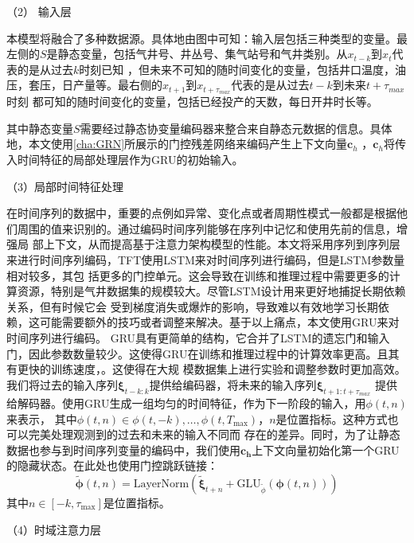 （2） 输入层

本模型将融合了多种数据源。具体地由图中可知：输入层包括三种类型的变量。最左侧的$S$是静态变量，包括气井号、井丛号、集气站号和气井类别。从$x_{t-k}$到$x_t$代表的是从过去$k$时刻已知
，但未来不可知的随时间变化的变量，包括井口温度，油压，套压，日产量等。最右侧的$x_{t+1}$到$x_{t+\tau_{max}} $代表的是从过去$t-k$到未来$t+\tau_{max}$时刻
都可知的随时间变化的变量，包括已经投产的天数，每日开井时长等。

其中静态变量$S$需要经过静态协变量编码器来整合来自静态元数据的信息。具体地，本文使用\ref{cha:GRN}所展示的门控残差网络来编码产生上下文向量$\mathbf{c}_h$
，$\mathbf{c}_h$将传入时间特征的局部处理层作为GRU的初始输入。

（3）局部时间特征处理

在时间序列的数据中，重要的点例如异常、变化点或者周期性模式一般都是根据他们周围的值来识别的。通过编码时间序列能够在序列中记忆和使用先前的信息，增强局
部上下文，从而提高基于注意力架构模型的性能。本文将采用序列到序列层来进行时间序列编码，TFT使用LSTM来对时间序列进行编码，但是LSTM参数量相对较多，其包
括更多的门控单元。这会导致在训练和推理过程中需要更多的计算资源，特别是气井数据集的规模较大。尽管LSTM设计用来更好地捕捉长期依赖关系，但有时候它会
受到梯度消失或爆炸的影响，导致难以有效地学习长期依赖，这可能需要额外的技巧或者调整来解决。基于以上痛点，本文使用GRU来对时间序列进行编码。
GRU具有更简单的结构，它合并了LSTM的遗忘门和输入门，因此参数数量较少。这使得GRU在训练和推理过程中的计算效率更高。且其有更快的训练速度，。这使得在大规
模数据集上进行实验和调整参数时更加高效。我们将过去的输入序列$\bm{\xi}_{t-k:k}$提供给编码器，将未来的输入序列$\bm{\xi}_{t+1:t+\tau_{max}}$
提供给解码器。使用GRU生成一组均匀的时间特征，作为下一阶段的输入，用$\phi (t,n)$来表示，
其中$\phi(t,n) \in {\phi(t, -k), \ldots, \phi(t, T_{\text{max}})}$，$n$是位置指标。这种方式也可以完美处理观测到的过去和未来的输入不同而
存在的差异。同时，为了让静态数据也参与到时间序列变量的编码中，我们使用$\mathbf{c_h}$上下文向量初始化第一个GRU的隐藏状态。在此处也使用门控跳跃链接：
\begin{equation}
    \tilde{\bm{\phi}}(t, n) = \text{LayerNorm}\left(\tilde{\bm{\xi}}_{t+n} + \text{GLU}_{\tilde{\phi}}(\bm{\phi}(t, n))\right)
\end{equation}
其中$n \in [ -k, \tau_{\max}]$是位置指标。

（4）时域注意力层

